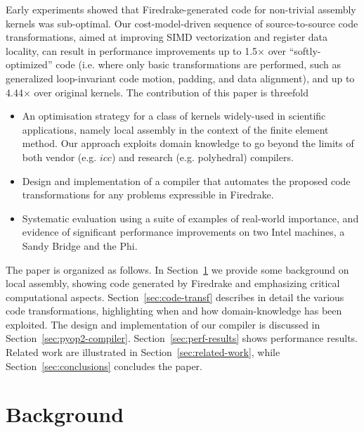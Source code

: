 \documentclass[conference]{IEEEtran}
\begin{document}
Early experiments showed that Firedrake-generated code for non-trivial assembly kernels was sub-optimal. Our cost-model-driven sequence of source-to-source code transformations, aimed at improving SIMD vectorization and register data locality, can result in performance improvements up to 1.5$\times$ over ``softly-optimized'' code (i.e. where only basic transformations are performed, such as generalized loop-invariant code motion, padding, and data alignment), and up to 4.44$\times$ over original kernels. The contribution of this paper is threefold
\begin{itemize}
\item An optimisation strategy for a class of kernels widely-used in scientific applications, namely local assembly in the context of the finite element method. Our approach exploits domain knowledge to go beyond the limits of both vendor (e.g. $icc$) and research (e.g. polyhedral) compilers.
\item Design and implementation of a compiler that automates the proposed code transformations for any problems expressible in Firedrake.
\item Systematic evaluation using a suite of examples of real-world importance, and evidence of significant performance improvements on two Intel machines, a Sandy Bridge and the Phi.
\end{itemize}

The paper is organized as follows. In Section~\ref{sec:background} we provide some background on local assembly, showing code generated by Firedrake and emphasizing critical computational aspects. Section~\ref{sec:code-transf} describes in detail the various code transformations, highlighting when and how domain-knowledge has been exploited. The design and implementation of our compiler is discussed in Section~\ref{sec:pyop2-compiler}. Section~\ref{sec:perf-results} shows performance results. Related work are illustrated in Section~\ref{sec:related-work}, while Section~\ref{sec:conclusions} concludes the paper.



\section{Background}
\label{sec:background}
\end{document}
